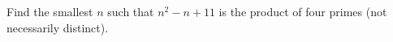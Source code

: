 Find the smallest $n$ such that $n^2 -n+11$ is the product of four primes (not necessarily distinct).